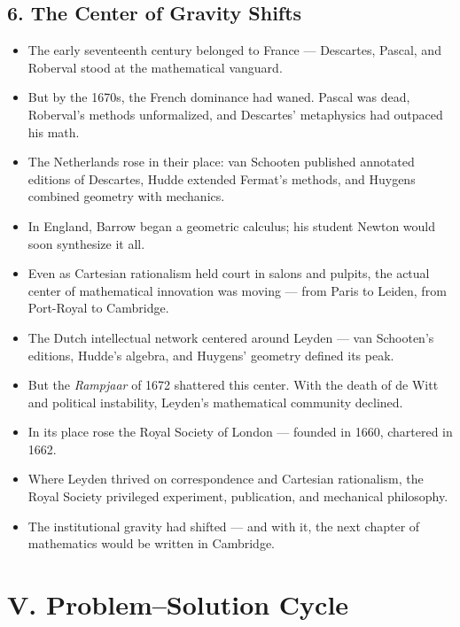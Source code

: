 \documentclass[9pt]{article}
\begin{document}
\subsection*{6. The Center of Gravity Shifts}
\begin{itemize}
  \item The early seventeenth century belonged to France — Descartes, Pascal, and Roberval stood at the mathematical vanguard.
  \item But by the 1670s, the French dominance had waned. Pascal was dead, Roberval’s methods unformalized, and Descartes' metaphysics had outpaced his math.
  \item The Netherlands rose in their place: van Schooten published annotated editions of Descartes, Hudde extended Fermat’s methods, and Huygens combined geometry with mechanics.
  \item In England, Barrow began a geometric calculus; his student Newton would soon synthesize it all.
  \item Even as Cartesian rationalism held court in salons and pulpits, the actual center of mathematical innovation was moving — from Paris to Leiden, from Port-Royal to Cambridge.
    \item The Dutch intellectual network centered around Leyden — van Schooten’s editions, Hudde’s algebra, and Huygens’ geometry defined its peak.
  \item But the \textit{Rampjaar} of 1672 shattered this center. With the death of de Witt and political instability, Leyden’s mathematical community declined.
  \item In its place rose the Royal Society of London — founded in 1660, chartered in 1662.
  \item Where Leyden thrived on correspondence and Cartesian rationalism, the Royal Society privileged experiment, publication, and mechanical philosophy.
  \item The institutional gravity had shifted — and with it, the next chapter of mathematics would be written in Cambridge.
\end{itemize}


\newpage

\section*{V. Problem--Solution Cycle}
\end{document}
